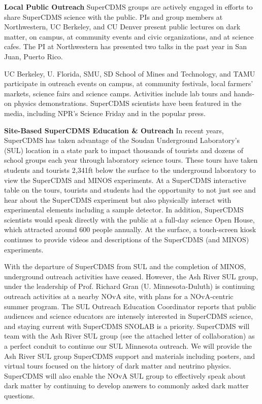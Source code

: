 \textbf{Local Public Outreach}
SuperCDMS groups are actively engaged in efforts to share SuperCDMS science with the public. PIs and group members at Northwestern, UC Berkeley, and CU Denver present public lectures on dark matter, on campus, at community events and civic organizations, and at science cafes. The PI at Northwestern has presented two talks in the past year in San Juan, Puerto Rico. 

UC Berkeley, U. Florida, SMU, SD School of Mines and Technology, and TAMU participate in outreach events on campus, at community festivals, local farmers’ markets, science fairs and science camps. Activities include lab tours and hands-on physics demonstrations. SuperCDMS scientists have been featured in the media, including NPR’s Science Friday and in the popular press. 

\textbf{Site-Based SuperCDMS Education \& Outreach}
In recent years, SuperCDMS has taken advantage of the Soudan Underground Laboratory’s (SUL) location in a state park to impact thousands of tourists and dozens of school groups each year through laboratory science tours. These tours have taken students and tourists 2,341ft below the surface to the underground laboratory to view the SuperCDMS and MINOS experiments. At a SuperCDMS interactive table on the tours, tourists and students had the opportunity to not just see and hear about the SuperCDMS experiment but also physically interact with experimental elements including a sample detector. In addition, SuperCDMS scientists would speak directly with the public at a full-day science Open House, which attracted around 600 people annually. At the surface, a touch-screen kiosk continues to provide videos and descriptions of the SuperCDMS (and MINOS) experiments. 

With the departure of SuperCDMS from SUL and the completion of MINOS, underground outreach activities have ceased. However, the Ash River SUL group, under the leadership of Prof. Richard Gran (U. Minnesota-Duluth) is continuing outreach activities at a nearby NOvA site, with plans for a NOvA-centric summer program. The SUL Outreach Education Coordinator reports that public audiences and science educators are intensely interested in SuperCDMS science, and staying current with SuperCDMS SNOLAB is a priority. SuperCDMS will team with the Ash River SUL group (see the attached letter of collaboration) as a perfect conduit to continue our SUL Minnesota outreach. We will provide the Ash River SUL group SuperCDMS support and materials including posters, and virtual tours focused on the history of dark matter and neutrino physics. SuperCDMS will also enable the NOvA SUL group to effectively speak about dark matter by continuing to develop answers to commonly asked dark matter questions.

